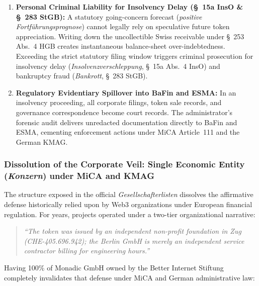 \documentclass[a4paper,11pt,twoside,parskip=half-,headings=small]{scrartcl}
\begin{document}
\begin{enumerate}[nosep]
\begin{itemize}[nosep]
    \item \emph{Gratuitous Transfers (\S~134 InsO -- Schenkungsanfechtung):} Any migration of source code, tooling, or infrastructure without an audited, arms-length cash purchase price (\emph{Fremdvergleich}) is statutorily voided and reclaimed for the bankruptcy estate.
    \item \emph{Destruction of Corporate Existence (\S~826 BGB -- Existenzvernichtender Eingriff):} Under established Federal Court of Justice (\emph{Bundesgerichtshof} -- BGH) jurisprudence, stripping operational substance from an operating GmbH while stranding an uncollectible receivable against an offshore parent constitutes intentional immoral injury to creditors (\emph{vors{\"a}tzliche sittenwidrige Sch{\"a}digung}), piercing the corporate veil to impose unlimited, joint personal civil liability on managing and shadow directors.
  \end{itemize}
  \item \textbf{Personal Criminal Liability for Insolvency Delay (\S~15a InsO \& \S~283 StGB):} A statutory going-concern forecast (\emph{positive Fortf{\"u}hrungsprognose}) cannot legally rely on speculative future token appreciation. Writing down the uncollectible Swiss receivable under \S~253 Abs.~4 HGB creates instantaneous balance-sheet over-indebtedness. Exceeding the strict statutory filing window triggers criminal prosecution for insolvency delay (\emph{Insolvenzverschleppung}, \S~15a Abs.~4 InsO) and bankruptcy fraud (\emph{Bankrott}, \S~283 StGB).
  \item \textbf{Regulatory Evidentiary Spillover into BaFin and ESMA:} In an insolvency proceeding, all corporate filings, token sale records, and governance correspondence become court records. The administrator's forensic audit delivers unredacted documentation directly to BaFin and ESMA, cementing enforcement actions under MiCA Article~111 and the German KMAG.
\end{enumerate}

\subsubsection{Dissolution of the Corporate Veil: Single Economic Entity (\emph{Konzern}) under MiCA and KMAG}
\label{sec:corporate_veil_dissolution}

The structure exposed in the official \emph{Gesellschafterlisten} dissolves the affirmative defense historically relied upon by Web3 organizations under European financial regulation. For years, projects operated under a two-tier organizational narrative:
\begin{quote}
\emph{``The token was issued by an independent non-profit foundation in Zug (CHE-405.696.942); the Berlin GmbH is merely an independent service contractor billing for engineering hours.''}
\end{quote}
Having 100\% of Monadic GmbH owned by the Better Internet Stiftung completely invalidates that defense under MiCA and German administrative law:
\end{document}
